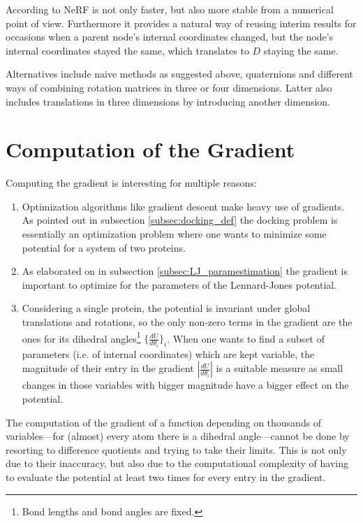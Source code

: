 \documentclass[12pt]{article}
\theoremstyle{definition}\newtheorem*{definition}{Definition}
\theoremstyle{definition}\newtheorem*{remark}{Remark}
\begin{document}
According to \cite{nerf} NeRF is not only faster, but also more stable from a numerical point of view.
Furthermore it provides a natural way of reusing interim results for occasions when a parent node's internal coordinates changed, but the node's internal coordinates stayed the same, which translates to $D$ staying the same.

Alternatives include naive methods as suggested above, quaternions and different ways of combining rotation matrices in three or four dimensions. Latter also includes translations in three dimensions by introducing another dimension.





\section{Computation of the Gradient}
Computing the gradient is interesting for multiple reasons:
\begin{enumerate}
	\item Optimization algorithms like gradient descent make heavy use of gradients. As pointed out in subsection \ref{subsec:docking_def} the docking problem is essentially an optimization problem where one wants to minimize some potential for a system of two proteins.
	\item As elaborated on in subsection \ref{subsec:LJ_paramestimation} the gradient is important to optimize for the parameters of the Lennard-Jones potential.
	\item Considering a single protein, the potential is invariant under global translations and rotations, so the only non-zero terms in the gradient are the ones for its dihedral angles\footnote{Bond lengths and bond angles are fixed.} $\{\frac{dU}{d\theta_i}\}_i$. When one wants to find a subset of parameters (i.e. of internal coordinates) which are kept variable, the magnitude of their entry in the gradient $|\frac{dU}{d\theta_i}|$ is a suitable measure as small changes in those variables with bigger magnitude have a bigger effect on the potential.
\end{enumerate}

The computation of the gradient of a function depending on thousands of variables---for (almost) every atom there is a dihedral angle---cannot be done by resorting to difference quotients and trying to take their limits. This is not only due to their inaccuracy, but also due to the computational complexity of having to evaluate the potential at least two times for every entry in the gradient.
\end{document}
